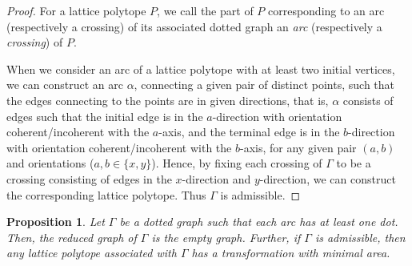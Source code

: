 \documentclass[a4paper,11pt]{amsart}
\numberwithin{equation}{section}
\newtheorem{proposition}[theorem]{Proposition}
\begin{document}
\begin{proof}
For a lattice polytope $P$, we call the part of $P$ corresponding to an arc (respectively a crossing) of its associated dotted graph an {\it arc} (respectively a {\it crossing}) of $P$. %

When we consider an arc of a lattice polytope with at least two initial vertices, we can construct an arc $\alpha$, connecting a given pair of distinct points, such that the edges connecting to the points are in given directions, that is, $\alpha$ consists of edges such that the initial edge is in the $a$-direction with orientation coherent/incoherent with the $a$-axis, and the terminal edge is in the $b$-direction with orientation coherent/incoherent with the $b$-axis, for any given pair $(a,b)$ and orientations ($a,b \in \{x,y\}$). Hence, by fixing each crossing of $\Gamma$ to be a crossing consisting of edges in the $x$-direction and $y$-direction, 
we can construct the corresponding lattice polytope. Thus $\Gamma$ is admissible. 
\end{proof}

\begin{proposition}\label{prop3-9}
Let $\Gamma$ be a dotted graph such that each arc has at least one dot. Then, the reduced graph of $\Gamma$ is the empty graph. 
Further, if $\Gamma$ is admissible, then any lattice polytope associated with $\Gamma$ has a transformation with minimal area. 
%
\end{proposition}
\end{document}

